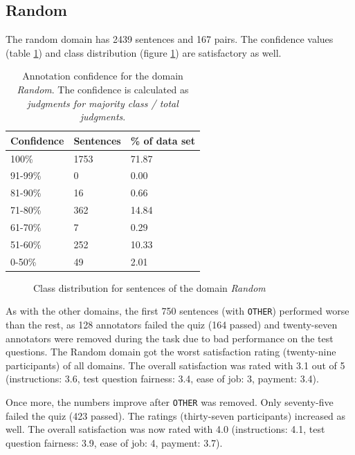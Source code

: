 \subsection{Random}
The random domain has 2439 sentences and 167 pairs. The confidence values (table \ref{fig:random_agg}) and class distribution (figure \ref{fig:random_fin}) are satisfactory as well.
\begin{table}[h]
\caption{Annotation confidence for the domain \emph{Random}. The confidence is calculated as \emph{judgments for majority class / total judgments}.}
\label{fig:random_agg}
\begin{tabularx}{\textwidth}{XXX}
\toprule
Confidence & Sentences & \% of data set \\
\midrule
100\%	&	1753	&	71.87	 \\ 
91-99\%	&	0	&	0.00	 \\ 
81-90\%	&	16	&	0.66	 \\ 
71-80\%	&	362	&	14.84	 \\ 
61-70\%	&	7	&	0.29	 \\ 
51-60\%	&	252	&	10.33	 \\ 
0-50\%	&	49	&	2.01	 \\ 
\bottomrule
\end{tabularx}
\end{table}

\begin{figure}[h]
\centering
\caption{Class distribution for sentences of the domain \emph{Random}}
\label{fig:random_fin}
\end{figure}

As with the other domains, the first 750 sentences (with \texttt{OTHER}) performed worse than the rest, as 128 annotators failed the quiz (164 passed) and twenty-seven annotators were removed during the task due to bad performance on the test questions. The Random domain got the worst satisfaction rating (twenty-nine participants) of all domains. The overall satisfaction was rated with 3.1 out of 5 (instructions: 3.6, test question fairness: 3.4, ease of job: 3, payment: 3.4).

Once more, the numbers improve after \texttt{OTHER} was removed. Only seventy-five failed the quiz (423 passed). The ratings (thirty-seven participants) increased as well. The overall satisfaction was now rated with 4.0 (instructions: 4.1, test question fairness: 3.9, ease of job: 4, payment: 3.7).


